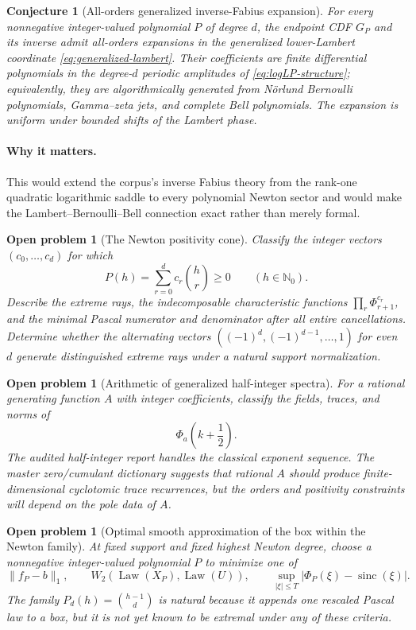 \documentclass[11pt,oneside]{article}
\numberwithin{equation}{section}
\newtheorem{conjecture}[theorem]{Conjecture}
\newtheorem{problem}[theorem]{Open problem}
\theoremstyle{definition}
\theoremstyle{remark}
\newcommand{\N}{\mathbb N}
\newcommand{\Law}{\operatorname{Law}}
\newcommand{\sinc}{\operatorname{sinc}}
\begin{document}
\begin{conjecture}[All-orders generalized inverse-Fabius expansion]
\label{conj:inverse-transseries}
For every nonnegative integer-valued polynomial $P$ of degree $d$, the endpoint CDF $G_P$ and
its inverse admit all-orders expansions in the generalized lower-Lambert coordinate
\eqref{eq:generalized-lambert}.  Their coefficients are finite differential polynomials in
the degree-$d$ periodic amplitudes of \eqref{eq:logLP-structure}; equivalently, they are
algorithmically generated from N\"orlund Bernoulli polynomials, Gamma--zeta jets, and
complete Bell polynomials.  The expansion is uniform under bounded shifts of the Lambert
phase.
\end{conjecture}

\paragraph{Why it matters.}
This would extend the corpus's inverse Fabius theory from the rank-one quadratic logarithmic
saddle to every polynomial Newton sector and would make the Lambert--Bernoulli--Bell
connection exact rather than merely formal.

\begin{problem}[The Newton positivity cone]
\label{prob:newton-cone}
Classify the integer vectors $(c_0,\ldots,c_d)$ for which
\[
 P(h)=\sum_{r=0}^{d}c_r\binom hr\ge0
 \qquad(h\in\N_0).
\]
Describe the extreme rays, the indecomposable characteristic functions
$\prod_r\Phi_{r+1}^{c_r}$, and the minimal Pascal numerator and denominator after all entire
cancellations.  Determine whether the alternating vectors
$((-1)^d,(-1)^{d-1},\ldots,1)$ for even $d$ generate distinguished extreme rays under a
natural support normalization.
\end{problem}

\begin{problem}[Arithmetic of generalized half-integer spectra]
For a rational generating function $A$ with integer coefficients, classify the fields,
traces, and norms of
\[
 \Phi_a\!\left(k+\frac12\right).
\]
The audited half-integer report handles the classical exponent sequence.  The master
zero/cumulant dictionary suggests that rational $A$ should produce finite-dimensional
cyclotomic trace recurrences, but the orders and positivity constraints will depend on the
pole data of $A$.
\end{problem}

\begin{problem}[Optimal smooth approximation of the box within the Newton family]
At fixed support and fixed highest Newton degree, choose a nonnegative integer-valued
polynomial $P$ to minimize one of
\[
 \|f_P-b\|_1,
 \qquad
 W_2(\Law(X_P),\Law(U)),
 \qquad
 \sup_{|\xi|\le T}|\Phi_P(\xi)-\sinc(\xi)|.
\]
The family $P_d(h)=\binom{h-1}{d}$ is natural because it appends one rescaled Pascal law to a
box, but it is not yet known to be extremal under any of these criteria.
\end{problem}
\end{document}
